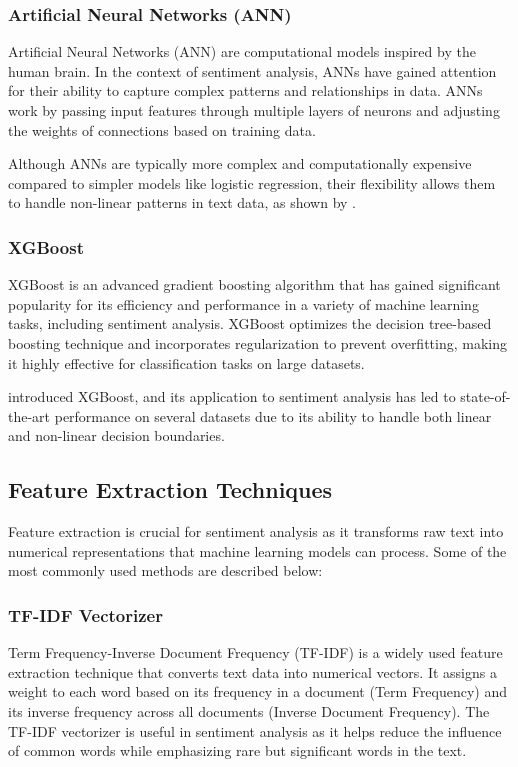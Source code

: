 \subsubsection{Artificial Neural Networks (ANN)}

Artificial Neural Networks (ANN) are computational models inspired by the human brain. In the context of sentiment analysis, ANNs have gained attention for their ability to capture complex patterns and relationships in data. ANNs work by passing input features through multiple layers of neurons and adjusting the weights of connections based on training data.

Although ANNs are typically more complex and computationally expensive compared to simpler models like logistic regression, their flexibility allows them to handle non-linear patterns in text data, as shown by \cite{Collobert2011}.

\subsubsection{XGBoost}

XGBoost is an advanced gradient boosting algorithm that has gained significant popularity for its efficiency and performance in a variety of machine learning tasks, including sentiment analysis. XGBoost optimizes the decision tree-based boosting technique and incorporates regularization to prevent overfitting, making it highly effective for classification tasks on large datasets.

\cite{Chen2016} introduced XGBoost, and its application to sentiment analysis has led to state-of-the-art performance on several datasets due to its ability to handle both linear and non-linear decision boundaries.

\subsection{Feature Extraction Techniques}

Feature extraction is crucial for sentiment analysis as it transforms raw text into numerical representations that machine learning models can process. Some of the most commonly used methods are described below:

\subsubsection{TF-IDF Vectorizer}

Term Frequency-Inverse Document Frequency (TF-IDF) is a widely used feature extraction technique that converts text data into numerical vectors. It assigns a weight to each word based on its frequency in a document (Term Frequency) and its inverse frequency across all documents (Inverse Document Frequency). The TF-IDF vectorizer is useful in sentiment analysis as it helps reduce the influence of common words while emphasizing rare but significant words in the text.

